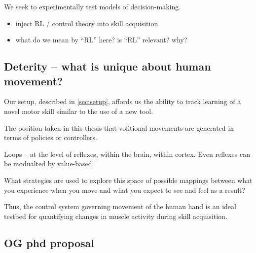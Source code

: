 {            We seek to experimentally test models of decision-making.

            \begin{itemize}
            \tightlist
            \item
              inject RL / control theory into skill acquisition
            \item
              what do we mean by ``RL'' here? is ``RL'' relevant? why?
            \end{itemize}

            \hypertarget{deterity-what-is-unique-about-human-movement}{%
            \subsection{Deterity -- what is unique about human
            movement?}\label{deterity-what-is-unique-about-human-movement}}

            Our setup, described in \cref{sec:setup}, affords us the
            ability to track learning of a novel motor skill similar to
            the use of a new tool.

            The position taken in this thesis that volitional movements
            are generated in terms of policies or controllers.

            Loops -- at the level of reflexes, within the brain, within
            cortex. Even reflexes can be modualted by value-based.

            What strategies are used to explore this space of possible
            mappings between what you experience when you move and what
            you expect to see and feel as a result?

            Thus, the control system governing movement of the human
            hand is an ideal testbed for quantifying changes in muscle
            activity during skill acquisition.

            \hypertarget{section}{%
            \subsection{}\label{section}}

            \hypertarget{og-phd-proposal}{%
            \subsection{OG phd proposal}\label{og-phd-proposal}}

            \hypertarget{todorov-2009}{%
}}
